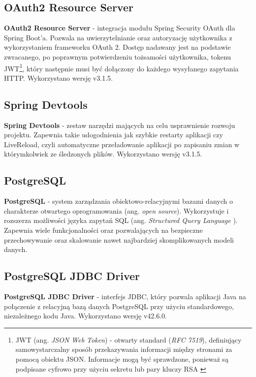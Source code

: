 \documentclass[11pt,a4paper]{article}
\begin{document}
\subsection{OAuth2 Resource Server}
\textbf{OAuth2 Resource Server} \cite{oauth2} - integracja modułu Spring Security OAuth dla Spring Boot'a. Pozwala na uwierzytelnianie oraz autoryzację użytkownika z wykorzystaniem frameworku OAuth 2. Dostęp nadawany jest na podstawie zwracanego, po poprawnym potwierdzeniu tożsamości użytkownika, tokenu JWT\footnote{JWT (ang. \textsl{JSON Web Token}) - otwarty standard (\textsl{RFC 7519}), definiujący samowystarczalny sposób przekazywania informacji między stronami za pomocą obiektu JSON. Informacje mogą być sprawdzone, ponieważ są podpisane cyfrowo przy użyciu sekretu lub pary kluczy RSA \cite{jwt}}, który następnie musi być dołączony do każdego wysyłanego zapytania HTTP. Wykorzystano wersję v3.1.5.

\subsection{Spring Devtools}
\textbf{Spring Devtools} \cite{spring-devtools} - zestaw narzędzi mających na celu usprawnienie rozwoju projektu. Zapewnia takie udogodnienia jak szybkie restarty aplikacji czy LiveReload, czyli automatyczne przeładowanie aplikacji po zapisaniu zmian w którymkolwiek ze śledzonych plików. Wykorzystano wersję v3.1.5.

\subsection{PostgreSQL}
\textbf{PostgreSQL} \cite{postgresql} - system zarządzania obiektowo-relacyjnymi bazami danych o charakterze otwartego oprogramowania (ang. \textsl{open source}). Wykorzystuje i rozszerza możliwości języka zapytań SQL (ang. \textsl{Structured Query Language} \cite{sql}). Zapewnia wiele funkcjonalności oraz pozwalających na bezpieczne przechowywanie oraz skalowanie nawet najbardziej skomplikowanych modeli danych.

\subsection{PostgreSQL JDBC Driver}
\textbf{PostgreSQL JDBC Driver} \cite{postgres-driver} - interfejs JDBC, który pozwala aplikacji Java na połączenie z relacyjną bazą danych PostgreSQL przy użyciu standardowego, niezależnego kodu Java. Wykorzystano wersję v42.6.0.
\end{document}
